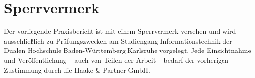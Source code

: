 \chapter*{Sperrvermerk}
Der vorliegende Praxisbericht ist mit einem Sperrvermerk versehen und wird ausschließlich zu Prüfungszwecken am Studiengang Informationstechnik der Dualen Hochschule Baden-Württemberg Karlsruhe vorgelegt.
Jede Einsichtnahme und Veröffentlichung – auch von Teilen der Arbeit – bedarf der vorherigen Zustimmung durch die Haake \& Partner GmbH.